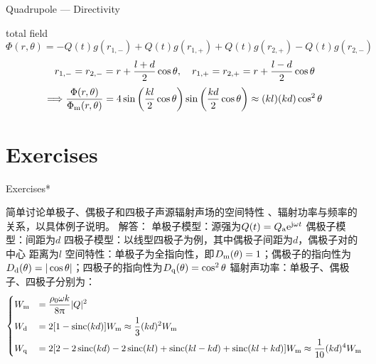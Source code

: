 \documentclass[9pt,mathserif]{beamer}
\let\emph\relax %
\begin{document}
\begin{frame}{Quadrupole --- Directivity}
	\begin{outline}
		\1 total field
		$$
		\Phi(r, \theta) = -Q(t)g(r_{1,-}) + Q(t)g(r_{1,+}) + Q(t)g(r_{2,+})
		-Q(t)g(r_{2,-})
		$$
		$$r_{1,-} = r_{2,-} = r +\frac{l+d}{2} \cos \theta\qc 
		r_{1,+} = r_{2,+} = r+\frac{l-d}{2}\cos\theta$$
		$$\Longrightarrow \frac{\Phi(r,\theta)}{\Phi_\text{m}(r,\theta)}= 4\sin \qty(\frac{
		kl}{2} \cos\theta) \sin \qty(\frac{kd}{2} \cos\theta)
		\approx (kl)(kd) \cos^2\theta$$
	\end{outline}
\end{frame}

\section{Exercises}
\begin{frame}{Exercises*}
	\begin{outline}
		\1 \emph{3.} 简单讨论单极子、偶极子和四极子声源辐射声场的空间特性
		、辐射功率与频率的关系，以具体例子说明。
		\1 解答：
		\1 单极子模型：源强为$Q(t)=Q_\text{a}\mathrm{e}^{\mathrm{j} \omega t}$
		\1 偶极子模型：间距为$d$
		\1 四极子模型：以线型四极子为例，其中偶极子间距为$d$，偶极子对的中心
		距离为$l$
		\1 空间特性：单极子为全指向性，即$D_\text{m}(\theta)=1$；偶极子的指向性为$
		D_\text{d}(\theta) = |\cos\theta|$；四极子的指向性为$D_\text{q}(\theta)=
		\cos^2\theta$
		\1 辐射声功率：单极子、偶极子、四极子分别为：
		$$
		\begin{dcases}
			W_\text{m} &= \frac{\rho_0 \omega k}{8\uppi} |Q|^2\\
			W_\text{d} &=2[1-\operatorname{sinc}(kd)]W_\text{m} \approx \frac13 (kd)^2 W_\text{m}\\
			W_\text{q} & = 2[2-2\operatorname{sinc}(kd) -2\operatorname{sinc}(kl)+\operatorname{sinc}(kl-kd)+
			\operatorname{sinc}(kl+kd)]W_\text{m} \approx \frac{1}{10} (kd)^4W_\text{m}
		\end{dcases}
		$$
	\end{outline}
\end{frame}
\end{document}
